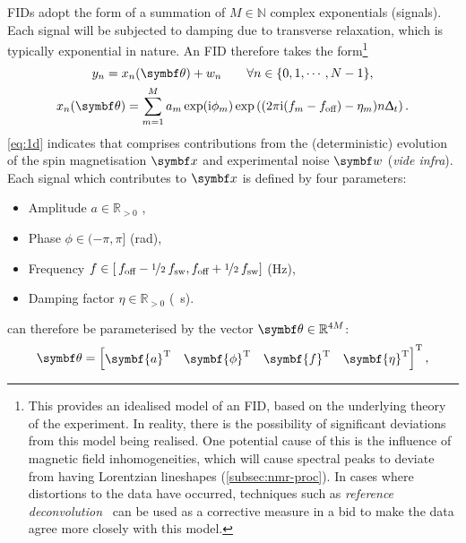 \acp{FID} adopt the form of a summation of $M \in \mathbb{N}$ complex
exponentials (signals). Each signal will be subjected to damping due to
transverse relaxation, which is typically exponential in nature. An \ac{FID}
therefore takes the form\footnote{
    This provides an idealised model of an \ac{FID}, based on the
    underlying theory of the experiment. In reality, there is the possibility
    of significant deviations from this model being realised. One potential
    cause of this is the influence of magnetic field inhomogeneities, which
    will cause spectral peaks to deviate from having Lorentzian lineshapes
    (\cref{subsec:nmr-proc}). In cases where distortions to the data have
    occurred, techniques such as \emph{reference deconvolution}~\cite{Morris1997}
    can be used as a corrective measure in a bid to make the data agree more
    closely with this model.
}
\begin{subequations}
    \begin{gather}
        y_n = x_n(\bth) + w_n \quad
            \quad \forall n \in \lbrace 0, 1, \cdots, N - 1 \rbrace,
            \label{eq:y=x+w} \\
        x_n(\bth) =
        \sumM \amexpphim \exp\left(
            (2 \pi \iu (f_m - \foff)- \eta_m ) n \Dt
        \right).
        \label{eq:x-1d}
    \end{gather}
    \label{eq:1d}%
\end{subequations}%
\cref{eq:1d} indicates that  comprises contributions from the
(deterministic) evolution of the spin magnetisation $\bx$ and experimental
noise $\bw$ (\emph{vide infra}). Each signal which contributes to $\bx$ is
defined by four parameters:
\begin{itemize}
    \item Amplitude $a \in \mathbb{R}_{>0}$ ,
    \label{pg:param-constraints}
    \item Phase $\phi \in (-\pi, \pi]$ (\unit{\radian}),
    \item Frequency $f \in \left[\hspace*{2pt}f_{\text{off}} - \nicefrac{1}{2} \hspace*{2pt}
        f_{\mathrm{sw}}, f_{\text{off}} + \nicefrac{1}{2} \hspace*{2pt}f_{\mathrm{sw}} \right]$ (\unit{\hertz}),
    \item Damping factor $\eta \in \mathbb{R}_{>0}$ (\unit{\per\second}).
\end{itemize}%
 can therefore be parameterised by the vector $\bth \in
\mathbb{R}^{4M}$:
\begin{equation}
    \bth =
    \begin{bmatrix}
        \symbf{a}\T & \symbf{\phi}\T & \symbf{f}\T & \symbf{\eta}\T
    \end{bmatrix}\T,
\end{equation}

